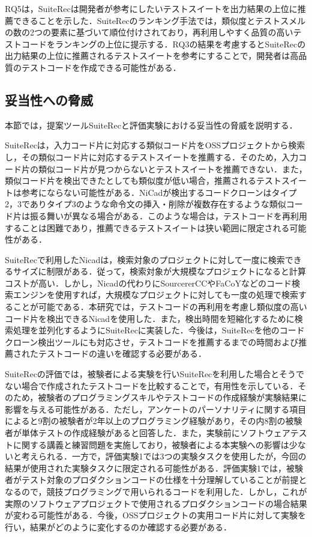 \documentclass[12pt]{jarticle} %
\begin{document}
RQ5は，{\sf SuiteRec}は開発者が参考にしたいテストスイートを出力結果の上位に推薦できることを示した．{\sf SuiteRec}のランキング手法では，類似度とテストスメルの数の2つの要素に基づいて順位付けされており，再利用しやすく品質の高いテストコードをランキングの上位に提示する．RQ3の結果を考慮すると{\sf SuiteRec}の出力結果の上位に推薦されるテストスイートを参考にすることで，開発者は高品質のテストコードを作成できる可能性がある．

\subsection{妥当性への脅威}

本節では，提案ツール{\sf SuiteRec}と評価実験における妥当性の脅威を説明する．

{\sf SuiteRec}は，入力コード片に対応する類似コード片をOSSプロジェクトから検索し，その類似コード片に対応するテストスイートを推薦する．そのため，入力コード片の類似コード片が見つからないとテストスイートを推薦できない．また，類似コード片を検出できたとしても類似度が低い場合，推薦されるテストスイートは参考にならない可能性がある．{\sf NiCad}が検出するコードクローンはタイプ2，3でありタイプ3のような命令文の挿入・削除が複数存在するような類似コード片は振る舞いが異なる場合がある．このような場合は，テストコードを再利用することは困難であり，推薦できるテストスイートは狭い範囲に限定される可能性がある．

{\sf SuiteRec}で利用した{\sf Nicad}は，検索対象のプロジェクトに対して一度に検索できるサイズに制限がある．従って，検索対象が大規模なプロジェクトになると計算コストが高い．しかし，{\sf Nicad}の代わりに{\sf SourcererCC}\cite{SourcererCC}や{\sf FaCoY}\cite{FaCoY}などのコード検索エンジンを使用すれば，大規模なプロジェクトに対しても一度の処理で検索することが可能である．本研究では，テストコードの再利用を考慮し類似度の高いコード片を検出できる{\sf Nicad}を使用した．また，検出時間を短縮化するために検索処理を並列化するように{\sf SuiteRec}に実装した．今後は，{\sf SuiteRec}を他のコードクローン検出ツールにも対応させ，テストコードを推薦するまでの時間および推薦されたテストコードの違いを確認する必要がある．

{\sf SuiteRec}の評価では，被験者による実験を行い{\sf SuiteRec}を利用した場合とそうでない場合で作成されたテストコードを比較することで，有用性を示している．そのため，被験者のプログラミングスキルやテストコードの作成経験が実験結果に影響を与える可能性がある．ただし，アンケートのパーソナリティに関する項目によると9割の被験者が2年以上のプログラミング経験があり，その内8割の被験者が単体テストの作成経験があると回答した．また，実験前にソフトウェアテストに関する講義と練習問題を実施しており，被験者による本実験への影響は少ないと考えられる．一方で，評価実験1では3つの実験タスクを使用したが，今回の結果が使用された実験タスクに限定される可能性がある．評価実験1では，被験者がテスト対象のプロダクションコードの仕様を十分理解していることが前提となるので，競技プログラミングで用いられるコードを利用した．しかし，これが実際のソフトウェアプロジェクトで使用されるプロダクションコードの場合結果が変わる可能性がある．今後，OSSプロジェクトの実用コード片に対して実験を行い，結果がどのように変化するのか確認する必要がある．
\end{document}
